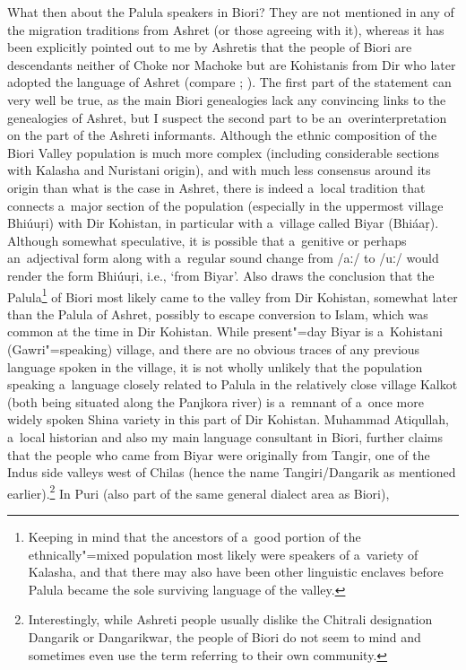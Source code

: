 What then about the Palula speakers in Biori? They are not mentioned in any of the migration
traditions from Ashret (or those agreeing with it), whereas it has been explicitly pointed out to me
by Ashretis that the people of Biori are descendants neither of Choke nor Machoke but are Kohistanis
from Dir who later adopted the language of Ashret (compare \citealt[255]{strand2001};
\citealt[296]{saeed2001}). The first part of the statement can very well be true, as the main Biori
genealogies lack any convincing links to the genealogies of Ashret, but I suspect the second part to
be an~overinterpretation on the part of the Ashreti informants. Although the ethnic composition of
the Biori Valley population is much more complex (including considerable sections with Kalasha and
Nuristani origin), and with much less consensus around its origin than what is the case in Ashret,
there is indeed a~local tradition that connects a~major section of the population (especially in the
uppermost village Bhiúuṛi) with Dir Kohistan, in particular with a~village called Biyar
(Bhiáaṛ). Although somewhat speculative, it is possible that a~genitive or perhaps an~adjectival
form along with a~regular sound change from ‌/aː/ to /uː/ would render the form Bhiúuṛi,
i.e., `from Biyar'. Also \citet[111--108]{cacopardo2001} draws the conclusion that the
Palula\footnote{Keeping in mind that the ancestors of a~good portion of the ethnically"=mixed
  population most likely were speakers of a~variety of Kalasha, and that there may also have been
  other linguistic enclaves before Palula became the sole surviving language of the valley.} of
Biori most likely came to the valley from Dir Kohistan, somewhat later than the Palula of Ashret,
possibly to escape conversion to Islam, which was common at the time in Dir Kohistan. While
present"=day Biyar is a~Kohistani (Gawri"=speaking) village, and there are no obvious traces of any
previous language spoken in the village, it is not wholly unlikely that the population speaking
a~language closely related to Palula in the relatively close village Kalkot (both being situated
along the Panjkora river) is a~remnant of a~once more widely spoken Shina variety in this part of
Dir Kohistan. Muhammad Atiqullah, a~local historian and also my main language consultant in Biori, further
claims that the people who came from Biyar were originally from Tangir, one of the Indus side
valleys west of Chilas (hence the name Tangiri/Dangarik as mentioned
earlier).\footnote{Interestingly, while Ashreti people usually dislike the Chitrali designation
  Dangarik or Dangarikwar, the people of Biori do not seem to mind and sometimes even use the term
  referring to their own community.} In Puri (also part of the same general dialect area as Biori),

